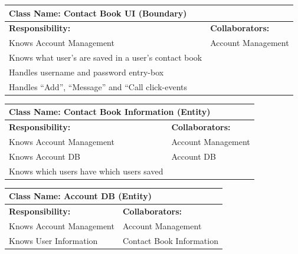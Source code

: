 \documentclass[]{article}
\begin{document}
\begin{table}[ht]
	\centering
	\begin{tabular}{|p{7cm}|p{7cm}|}
		\hline
		\multicolumn{2}{|l|}{\textbf{Class Name:} Contact Book UI (Boundary)}             \\
		\hline
		\textbf{Responsibility:}                             & \textbf{Collaborators:}  \\
		\hline
		Knows Account Management							 & Account Management         \\
		Knows what user’s are saved in a user’s contact book &                            \\
		Handles username and password entry-box 			 &                            \\
		Handles “Add”, “Message” and “Call click-events		 &                            \\

		\hline
	\end{tabular}
\end{table}

\begin{table}[ht]
	\centering
	\begin{tabular}{|p{7cm}|p{7cm}|}
		\hline
		\multicolumn{2}{|l|}{\textbf{Class Name:} Contact Book Information (Entity)}             \\
		\hline
		\textbf{Responsibility:}                             & \textbf{Collaborators:}  \\
		\hline
		Knows Account Management							 & Account Management         \\
		Knows Account DB									 & Account DB                 \\
		Knows which users have which users saved		     &                            \\


		\hline
	\end{tabular}
\end{table}

\begin{table}[ht]
	\centering
	\begin{tabular}{|p{7cm}|p{7cm}|}
		\hline
		\multicolumn{2}{|l|}{\textbf{Class Name:} Account DB (Entity)}             \\
		\hline
		\textbf{Responsibility:}                             & \textbf{Collaborators:}  \\
		\hline
		Knows Account Management							 & Account Management         \\
		Knows User Information							     & Contact Book Information   \\


		\hline
	\end{tabular}
\end{table}
\end{document}
